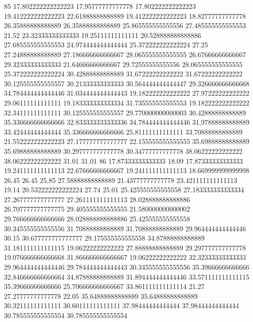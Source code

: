 85 17.802222222222223 17.95777777777778 17.802222222222223 19.412222222222223 22.61888888888889 19.412222222222223 18.82777777777778 26.35888888888889 26.35888888888889 25.865555555555556 27.485555555555553 21.52 23.32333333333333 19.25111111111111 20.528888888888886 27.685555555555553 24.974444444444444 25.372222222222224 27.25 27.24888888888889 27.186666666666667 28.065555555555555 26.67666666666667 29.32333333333333 21.64666666666667 29.72555555555556 28.065555555555555 25.372222222222224 30.42888888888889 31.67222222222222 31.67222222222222 30.125555555555557 30.21333333333333 30.564444444444447 29.326666666666668 34.784444444444446 31.034444444444443 19.182222222222222 27.97222222222222 29.06111111111111 19.183333333333334 31.735555555555553 19.182222222222222 32.34111111111111 30.125555555555557 29.770000000000003 30.42888888888889 35.336666666666666 32.833333333333336 34.784444444444446 31.97888888888889 33.42444444444444 35.336666666666666 25.81111111111111 33.70888888888889 21.552222222222223 27.177777777777777 22.155555555555555 35.69888888888889 35.69888888888889 30.297777777777778 30.34777777777778 38.06222222222222 38.06222222222222 31.01 31.01
86 17.87333333333333 18.09 17.87333333333333 19.241111111111113 22.67666666666667 19.241111111111113 18.669999999999998 26.45 26.45 25.85 27.58888888888889 21.43777777777778 23.421111111111113 19.14 20.532222222222224 27.74 25.01 25.425555555555558 27.183333333333334 27.267777777777777 27.261111111111113 28.028888888888886 26.707777777777775 29.405555555555555 21.580000000000002 29.766666666666666 28.028888888888886 25.425555555555558 30.345555555555556 31.70888888888889 31.70888888888889 29.964444444444446 30.15 30.677777777777777 29.175555555555558 34.87888888888889 31.181111111111115 19.06222222222222 27.88888888888889 29.297777777777778 19.076666666666668 31.866666666666667 19.06222222222222 32.32333333333333 29.964444444444446 29.784444444444443 30.345555555555556 35.39666666666666 32.846666666666664 34.87888888888889 31.894444444444446 33.571111111111115 35.39666666666666 25.706666666666667 33.861111111111114 21.27 27.27777777777778 22.05 35.64888888888889 35.64888888888889 30.32111111111111 30.60111111111111 37.98444444444444 37.98444444444444 30.785555555555554 30.785555555555554

